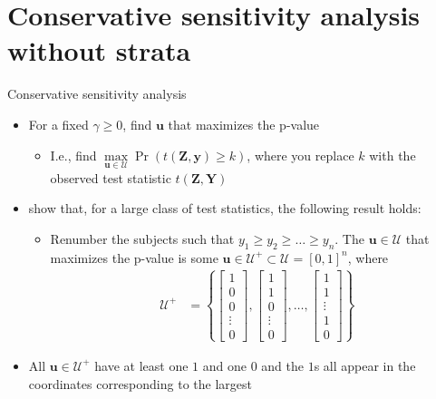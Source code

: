 \documentclass[table, xcolor={dvipsnames}, 9pt]{beamer}
\theoremstyle{newstyle}
\begin{document}
\section{Conservative sensitivity analysis without strata}
\begin{frame}{Conservative sensitivity analysis}
\begin{itemize}
\item For a fixed $\gamma \geq 0$, find $\mathbf{u}$ that maximizes the p-value 
\begin{itemize}
\item \pause I.e., find $\max \limits_{\mathbf{u} \in \mathcal{U}} \Pr\left(t\left(\mathbf{Z}, \mathbf{y}\right) \geq k \right)$, where you replace $k$ with the observed test statistic $t\left(\mathbf{Z}, \mathbf{Y}\right)$
\end{itemize}	
\item \pause \citet{rosenbaumkrieger1990} show that, for a large class of test statistics, the following result holds:
\begin{itemize}
\item[] 
\pause Renumber the subjects such that $y_1 \geq y_2 \geq \ldots \geq y_n$. The $\mathbf{u} \in \mathcal{U}$ that maximizes the p-value is some $\mathbf{u} \in \mathcal{U}^+ \subset \mathcal{U} = \left[0, 1\right]^n$, where
\begin{align*}
\mathcal{U}^+ & = \left\{
\begin{bmatrix} 1 \\ 0 \\ 0 \\ \vdots \\ 0 \end{bmatrix},
\begin{bmatrix} 1 \\ 1 \\ 0 \\ \vdots \\ 0 \end{bmatrix},
\ldots , 
\begin{bmatrix} 1 \\ 1 \\ \vdots \\ 1 \\ 0 \end{bmatrix}
\right\}
\end{align*}
\end{itemize}
\item \pause All $\mathbf{u} \in \mathcal{U}^+$ have at least one $1$ and one $0$ and the $1$s all appear in the coordinates corresponding to the largest 
\end{itemize}
\end{frame}
\end{document}
